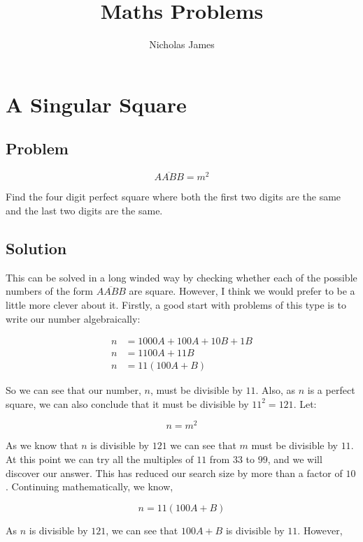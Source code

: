 \documentclass{article}
\title{Maths Problems}
\author{Nicholas James}
\begin{document}
\setlength{\parskip}{6pt}
\maketitle{}
\section{A Singular Square}
\subsection{Problem}
\[\overline{AABB}=m^2\]

Find the four digit perfect square where both the first two digits are the same and the last two digits are the same.

\subsection{Solution}

This can be solved in a long winded way by checking whether each of the possible numbers of the form \(\overline{AABB}\) are square. However, I think we would prefer to be a little more clever about it.
Firstly, a good start with problems of this type is to write our number algebraically:

\begin{align*}
  n&=1000A+100A+10B+1B\\
  n&=1100A+11B\\
  n&=11(100A+B)
\end{align*}

So we can see that our number, \(n\), must be divisible by \(11\). Also, as \(n\) is a perfect square, we can also conclude that it must be divisible by \(11^2=121\). Let:

\begin{equation*}
n=m^2
\end{equation*}

As we know that \(n\) is divisible by \(121\) we can see that \(m\) must be divisible by \(11\). At this point we can try all the multiples of \(11\) from \(33\) to \(99\), and we will discover our answer. This has reduced our search size by more than a factor of \(10\). Continuing mathematically, we know,

\begin{equation*}
n=11(100A+B)
\end{equation*}

As \(n\) is divisible by \(121\), we can see that \(100A+B\) is divisible by \(11\). However,
\end{document}
